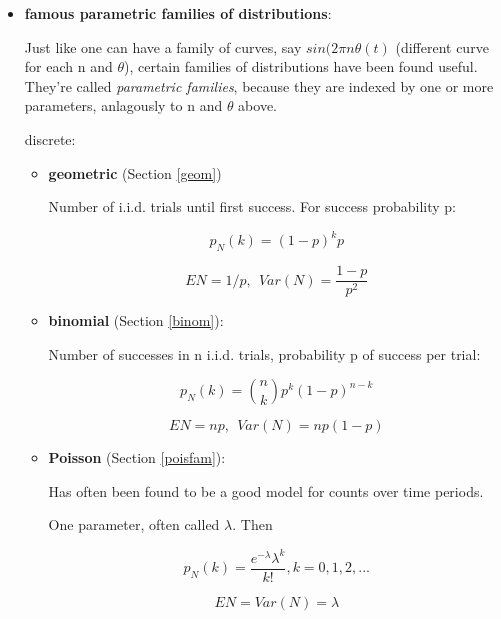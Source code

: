 \begin{itemize}
\begin{itemize}
   \end{itemize}

\item {\bf famous parametric families of distributions}:

Just like one can have a family of curves, say $sin(2\pi n \theta(t)$
(different curve for each n and $\theta$), certain families of
distributions have been found useful.  They're called {\it parametric
families}, because they are indexed by one or more parameters,
anlagously to n and $\theta$ above.

discrete:

   \begin{itemize}

   \item {\bf geometric} (Section \ref{geom})

   Number of i.i.d. trials until first success.  For success probability p: 

   \begin{equation}
   p_N(k) = (1-p)^k p
   \end{equation}

   \begin{equation}
   EN = 1/p, ~~ Var(N) =  \frac{1-p}{p^2}
   \end{equation}

   \item {\bf binomial} (Section \ref{binom}):

   Number of successes in n i.i.d. trials, probability p of success per
   trial:

   \begin{equation}
   p_N(k) = \binom{n}{k} p^k (1-p)^{n-k}  
   \end{equation}

   \begin{equation}
   EN = np, ~~ Var(N) = np(1-p)
   \end{equation}

   \item {\bf Poisson} (Section \ref{poisfam}):

   Has often been found to be a good model for counts over time periods.

   One parameter, often called $\lambda$.  Then

   \begin{equation}
   p_N(k) = \frac{e^{- \lambda} \lambda^k}{k!}, k = 0,1,2,...
   \end{equation}

   \begin{equation}
   EN = Var(N) = \lambda
   \end{equation}


\end{itemize}
\end{itemize}
